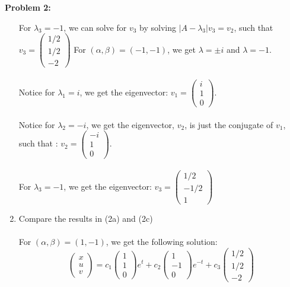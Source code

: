 \documentclass[11pt]{article}
\newenvironment{problem}[1]{\textbf{Problem #1: }}{\newpage}
\begin{document}
\begin{problem}{2}
\begin{enumerate}[label = (\alph*)]
			For $\lambda_3 = -1$, we can solve for $v_3$ by solving $|A - \lambda_3|v_3 = v_2$, such that $v_3 = \begin{pmatrix}
				1/2 \\ 1/2 \\ -2
			\end{pmatrix}$
			\newpage
			For $(\alpha,\beta) = (-1,-1)$, we get $\lambda = \pm i$ and $\lambda = -1$.
			\\ \\
			Notice for $\lambda_1 = i$, we get the eigenvector: $v_1 = \begin{pmatrix}
				i \\ 1 \\ 0
			\end{pmatrix}$.
			\\ \\
			Notice for $\lambda_2 = -i$, we get the eigenvector, $v_2$, is just the conjugate of $v_1$, such that : $v_2 = \begin{pmatrix}
				-i \\ 1 \\ 0
			\end{pmatrix}$.
			\\ \\
			For $\lambda_3 = -1$, we get the eigenvector: $v_3 = \begin{pmatrix}
				1/2 \\ -1/2 \\ 1
			\end{pmatrix}$
			\item Compare the results in (2a) and (2c)
			\\ \\
			For $(\alpha,\beta) = (1,-1)$, we get the following solution:
			\[\begin{pmatrix}
				x \\ u \\ v
			\end{pmatrix} = c_1\begin{pmatrix}
				1 \\ 1 \\ 0
			\end{pmatrix}e^t + c_2\begin{pmatrix}
				1 \\ -1	 \\ 0
			\end{pmatrix}e^{-t} + c_3\begin{pmatrix}
				1/2 \\ 1/2 \\ -2

\end{pmatrix}\]
\end{enumerate}
\end{problem}
\end{document}
